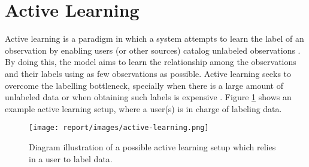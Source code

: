 \section{Active Learning} \label{sect:theory:active-learning}

Active learning is a paradigm in which a system attempts to learn the label of an observation by enabling users (or other sources) catalog unlabeled observations \cite{report:active-learning}. By doing this, the model aims to learn the relationship among the observations and their labels using as few observations as possible. Active learning seeks to overcome the labelling bottleneck, specially when there is a large amount of unlabeled data or when obtaining such labels is expensive \cite{report:active-learning}. Figure \ref{fig:active-learning} shows an example active learning setup, where a user(s) is in charge of labeling data.

\begin{figure}[H]
  \centering
  \texttt{[image: report/images/active-learning.png]}
  \caption{Diagram illustration of a possible active learning setup which relies in a user to label data.}
  \label{fig:active-learning}
\end{figure}
